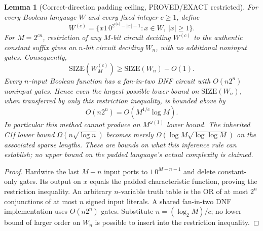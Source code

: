 \documentclass[11pt]{article}
\newtheorem{lemma}{Lemma}
\begin{document}
\begin{lemma}[Correct-direction padding ceiling, PROVED/EXACT restricted]
For every Boolean language $W$ and every fixed integer $c\ge1$, define
\[
W^{(c)}=\{x1\,0^{2^{c|x|}-|x|-1}:x\in W,\ |x|\ge1\}.
\]
For $M=2^{cn}$, restriction of any $M$-bit circuit deciding
$W^{(c)}$ to the authentic constant suffix gives an $n$-bit circuit
deciding $W_n$, with no additional noninput gates. Consequently,
\[
\mathrm{SIZE}(W^{(c)}_M)\ge \mathrm{SIZE}(W_n)-O(1).
\]
Every $n$-input Boolean function has a fan-in-two DNF circuit with
$O(n2^n)$ noninput gates. Hence even the largest possible lower bound
on $\mathrm{SIZE}(W_n)$, when transferred by \emph{only} this
restriction inequality, is bounded above by
\[
O(n2^n)=O(M^{1/c}\log M).
\]
In particular this method cannot produce an $M^{\omega(1)}$
lower bound. The inherited C1f lower bound
$\Omega(n\sqrt{\log n})$ becomes merely
$\Omega(\log M\sqrt{\log\log M})$ on the associated sparse lengths.
These are bounds on what \emph{this inference rule} can establish;
no upper bound on the padded language's actual complexity is claimed.
\end{lemma}
\begin{proof}
Hardwire the last $M-n$ input ports to $1\,0^{M-n-1}$ and delete
constant-only gates. Its output on $x$ equals the padded
characteristic function, proving the restriction inequality.
An arbitrary $n$-variable truth table is the OR of at most
$2^n$ conjunctions of at most $n$ signed input literals.
A shared fan-in-two DNF implementation uses $O(n2^n)$ gates.
Substitute $n=(\log_2M)/c$; no lower bound of larger order on
$W_n$ is possible to insert into the restriction inequality.
\end{proof}
\end{document}
